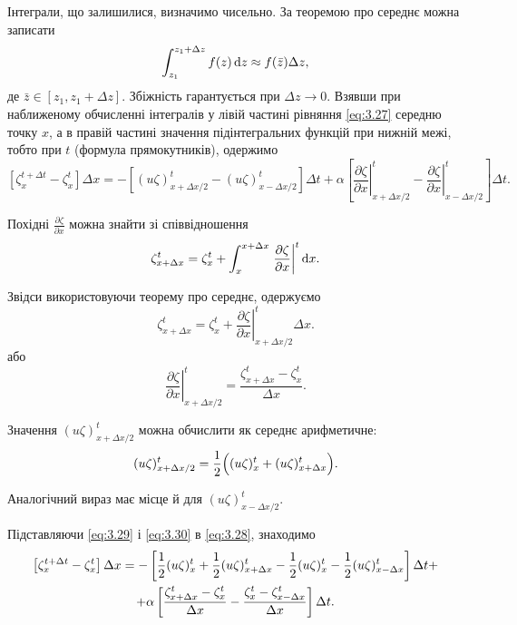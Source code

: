 Інтеграли, що залишилися, визначимо чисельно. За теоремою про середнє можна записати
\begin{equation*}
    \int_{z_1}^{z_1 + \Delta z} f(z) \mathop{}\!\mathrm{d} z \approx f(\bar z) \Delta z,
\end{equation*}
де $\bar z \in [z_1, z_1 + \Delta z]$. Збіжність гарантується при $\Delta z \to 0$. Взявши при наближеному обчисленні інтегралів у лівій частині рівняння \eqref{eq:3.27} середню точку $x$, а в правій частині значення підінтегральних функцій при нижній межі, тобто при $t$ (формула прямокутників), одержимо
\begin{equation}
    \label{eq:3.28}
    \left[ \zeta_x^{t + \Delta t} - \zeta_x^t \right] \Delta x = - \left[ (u \zeta)_{x + \Delta x / 2}^t - (u \zeta)_{x - \Delta x / 2}^t\right] \Delta t + \alpha \left[ \left. \frac{\partial \zeta}{\partial x} \right|_{x + \Delta x / 2}^t - \left. \frac{\partial \zeta}{\partial x} \right|_{x - \Delta x / 2}^t \right] \Delta t.
\end{equation}

Похідні $\frac{\partial \zeta}{\partial x}$ можна знайти зі співвідношення
\begin{equation*}
    \zeta_{x + \Delta x}^t = \zeta_x^t + \int_x^{x + \Delta x} \left. \frac{\partial \zeta}{\partial x} \right|^t \mathop{}\!\mathrm{d} x.
\end{equation*}

Звідси використовуючи теорему про середнє, одержуємо
\begin{equation*}
    \zeta_{x + \Delta x}^t = \zeta_x^t + \left. \frac{\partial \zeta}{\partial x} \right|_{x + \Delta x/2}^t \Delta x.
\end{equation*}
або
\begin{equation}
    \label{eq:3.29}
    \left. \frac{\partial \zeta}{\partial x} \right|_{x + \Delta x/2}^t = \frac{\zeta_{x + \Delta x}^t - \zeta_x^t}{\Delta x}.
\end{equation}

Значення $(u \zeta)_{x + \Delta x / 2}^t$ можна обчислити як середнє арифметичне:
\begin{equation}
    \label{eq:3.30}
    (u \zeta)_{x + \Delta x / 2}^t = \frac{1}{2} \Big( (u \zeta)_x^t + (u \zeta)_{x + \Delta x}^t \Big).
\end{equation}

Аналогічний вираз має місце й для $(u \zeta)_{x - \Delta x / 2}^t$. \medskip

Підставляючи \eqref{eq:3.29} і \eqref{eq:3.30} в \eqref{eq:3.28}, знаходимо
\begin{multline*}
    \left[ \zeta_x^{t + \Delta t} - \zeta_x^t \right] \Delta x = - \left[ \frac{1}{2} (u \zeta)_x^t + \frac{1}{2} (u \zeta)_{x + \Delta x}^t - \frac{1}{2} (u \zeta)_x^t - \frac{1}{2} (u \zeta)_{x - \Delta x}^t \right] \Delta t + \\ + \alpha \left[ \frac{\zeta_{x + \Delta x}^t - \zeta_x^t}{\Delta x} - \frac{\zeta_x^t - \zeta_{x - \Delta x}^t}{\Delta x} \right] \Delta t.
\end{multline*}

